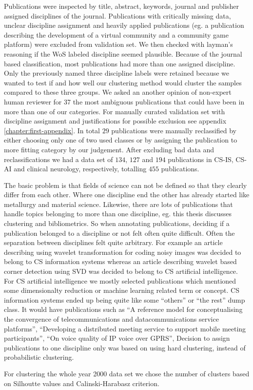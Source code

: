 Publications were inspected by title, abstract, keywords, journal
and publisher assigned disciplines of the journal. Publications
with critically missing data, unclear discipline assignment and
heavily applied publications (eg. a publication describing the 
development of a virtual community and a community game platform)
were excluded from validation set. 
We then checked with layman's reasoning if the WoS labeled 
discipline seemed plausible. Because of the journal based 
classification, most publications had more than one assigned 
discipline. Only the previously named three discipline labels were 
retained because we wanted to test if and how well our clustering 
method would cluster the samples compared to these three 
groups. We asked an another opinion of non-expert human 
reviewer for 37 the most ambiguous publications that could have 
been in more than one of our categories. 
For manually curated
validation set with discipline assignment and justifications for
possible exclusion see appendix \ref{chapter:first-appendix}.
In total $29$ publications were manually reclassified by either
choosing only one of two used classes or by assigning the 
publication to more fitting category by our judgement. After
excluding bad data and reclassifications we had a data set of 
$134$, $127$ and $194$ publications in CS-IS, CS-AI and clinical
neurology, respectively, totalling $455$ publications.

The basic problem is that fields of science can not be 
defined so that they clearly differ from each other. Where one 
discipline end the other has already started like metallurgy and 
material science. Likewise, there are lots of publications that 
handle topics belonging to more than one discipline, eg. this 
thesis discusses clustering and bibliometrics. So when annotating 
publications, deciding if a publication belonged to
a discipline or not felt often quite difficult. Often the 
separation between disciplines felt quite arbitrary. For example
an article describing using wavelet transformation for coding noisy
images was decided to belong to CS information systems whereas an
article describing wavelet based corner detection using SVD was
decided to belong to CS artificial intelligence.
For CS artificial intelligence we mostly selected publications 
which mentioned some dimensionalty reduction or machine learning 
related term or concept. CS information systems ended up being 
quite like some ``others'' or ``the rest'' dump class.
It would have publications such as
``A reference model for conceptualising the convergence of 
telecommunications and datacommunications service platforms'',
``Developing a distributed meeting service to support mobile 
meeting participants'',
``On voice quality of IP voice over GPRS'',
Decision to assign publications to one discipline only was based 
on using hard clustering, instead of probabilistic clustering. 

For clustering the whole year 2000 data set we chose the number 
of clusters based on Silhoutte values and Calinski-Harabasz 
criterion.



